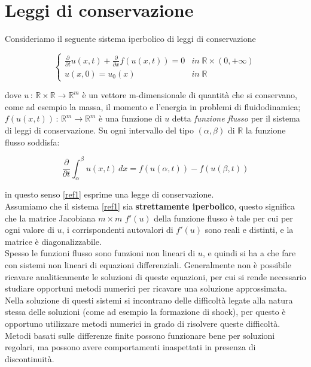 \section{Leggi di conservazione}
Consideriamo il seguente sistema iperbolico di leggi di conservazione
\begin{center}
\begin{equation}
\begin{cases}
\frac{\partial}{\partial t}u(x,t) + \frac{\partial}{\partial x} f(u(x,t)) = 0 & in \;  \mathbb{R}   \times ( 0, + \infty )  \\
u(x,0 ) = u_0(x) & in \; \mathbb{R}
\end{cases}\label{ref1}
\end{equation}
\end{center}
\noindent dove $ u \, : \, \mathbb{R} \times \mathbb{R}  \rightarrow \mathbb{R}^m$ è un vettore m-dimensionale di quantità che si conservano, come ad esempio la massa, il momento e l'energia in problemi di fluidodinamica; $f(u(x,t)) \,  : \, \mathbb{R}^m \rightarrow \mathbb{R}^m$ è una funzione di $u$ detta \textit{funzione flusso} per il sistema di leggi di conservazione. Su ogni intervallo del tipo $(\alpha, \beta) $ di $\mathbb{R}$ la funzione flusso soddisfa:
\begin{center}
\begin{equation}
\frac{\partial}{\partial t} \int_{\alpha}^{\beta} u(x,t) \, dx = f(u(\alpha, t))-f(u(\beta, t))
\end{equation}
\end{center}
\noindent in questo senso \ref{ref1} esprime una legge di conservazione. \\
\noindent Assumiamo che il sistema \ref{ref1} sia \textbf{strettamente iperbolico}, questo significa che la matrice Jacobiana $m \times m$ $f'(u)$ della funzione flusso è tale per cui per ogni valore di $u$, i corrispondenti autovalori di $f'(u)$ sono reali e distinti, e la matrice è diagonalizzabile.\\
\noindent Spesso le funzioni flusso sono funzioni non lineari di $u$, e quindi si ha a che fare con sistemi non lineari di equazioni differenziali. Generalmente non è possibile ricavare analiticamente le soluzioni di queste equazioni, per cui si rende necessario studiare opportuni metodi numerici per ricavare una soluzione approssimata. Nella soluzione di questi sistemi si incontrano delle difficoltà legate alla natura stessa delle soluzioni (come ad esempio la formazione di shock), per questo è opportuno utilizzare metodi numerici in grado di risolvere queste difficoltà. Metodi basati sulle differenze finite possono funzionare bene per soluzioni regolari, ma possono avere comportamenti inaspettati in presenza di discontinuità.\\
